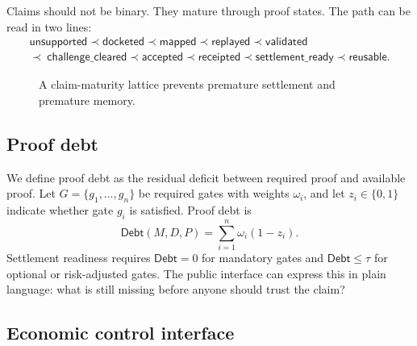 \documentclass[11pt]{article}
\begin{document}
Claims should not be binary. They mature through proof states. The path can be read in two lines:
\[
\begin{array}{c}
\textsf{unsupported} \prec \textsf{docketed} \prec \textsf{mapped} \prec \textsf{replayed} \prec \textsf{validated} \\
\prec\ \textsf{challenge\_cleared} \prec \textsf{accepted} \prec \textsf{receipted} \prec \textsf{settlement\_ready} \prec \textsf{reusable}.
\end{array}
\]

\begin{figure}[h]
\centering
{}
\caption{A claim-maturity lattice prevents premature settlement and premature memory.}
\label{fig:lattice}
\end{figure}

\subsection{Proof debt}

We define proof debt as the residual deficit between required proof and available proof. Let $G=\{g_1,\dots,g_n\}$ be required gates with weights $\omega_i$, and let $z_i\in\{0,1\}$ indicate whether gate $g_i$ is satisfied. Proof debt is
\[
  \mathsf{Debt}(M,D,P)=\sum_{i=1}^{n}\omega_i(1-z_i).
\]
Settlement readiness requires $\mathsf{Debt}=0$ for mandatory gates and $\mathsf{Debt}\leq\tau$ for optional or risk-adjusted gates. The public interface can express this in plain language: what is still missing before anyone should trust the claim?

\subsection{Economic control interface}
\end{document}
